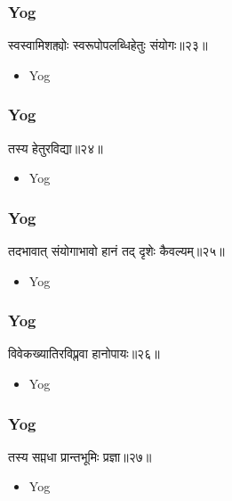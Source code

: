 \begin{frame}[fragile]\frametitle{Yog}
\begin{sanskrit}
स्वस्वामिशक्त्योः स्वरूपोपलब्धिहेतुः संयोगः॥२३॥
\end{sanskrit}
	\begin{itemize}
	\item Yog 
	\end{itemize}
\end{frame}

\begin{frame}[fragile]\frametitle{Yog}
\begin{sanskrit}
तस्य हेतुरविद्या॥२४॥
\end{sanskrit}
	\begin{itemize}
	\item Yog 
	\end{itemize}
\end{frame}

\begin{frame}[fragile]\frametitle{Yog}
\begin{sanskrit}
तदभावात् संयोगाभावो हानं तद् दृशेः कैवल्यम्॥२५॥
\end{sanskrit}
	\begin{itemize}
	\item Yog 
	\end{itemize}
\end{frame}

\begin{frame}[fragile]\frametitle{Yog}
\begin{sanskrit}
विवेकख्यातिरविप्लवा हानोपायः॥२६॥
\end{sanskrit}
	\begin{itemize}
	\item Yog 
	\end{itemize}
\end{frame}

\begin{frame}[fragile]\frametitle{Yog}
\begin{sanskrit}
तस्य सप्तधा प्रान्तभूमिः प्रज्ञा॥२७॥
\end{sanskrit}
	\begin{itemize}
	\item Yog 
	\end{itemize}
\end{frame}


